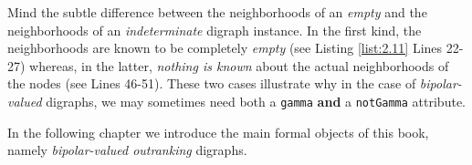Mind the subtle difference between the neighborhoods of an \emph{empty} and the neighborhoods of an \emph{indeterminate} digraph instance. In the first kind, the neighborhoods are known to be completely \emph{empty}  (see Listing \ref{list:2.11} Lines 22-27) whereas, in the latter, \emph{nothing is known} about the actual neighborhoods of the nodes  (see Lines 46-51). These two cases illustrate why in the case of \emph{bipolar-valued} digraphs, we may sometimes need both a \texttt{gamma} \textbf{and} a \texttt{notGamma} attribute.

\vspace{1cm}
In the following chapter we introduce the main formal objects of this book, namely \emph{bipolar-valued outranking} digraphs.

\clearpage


%